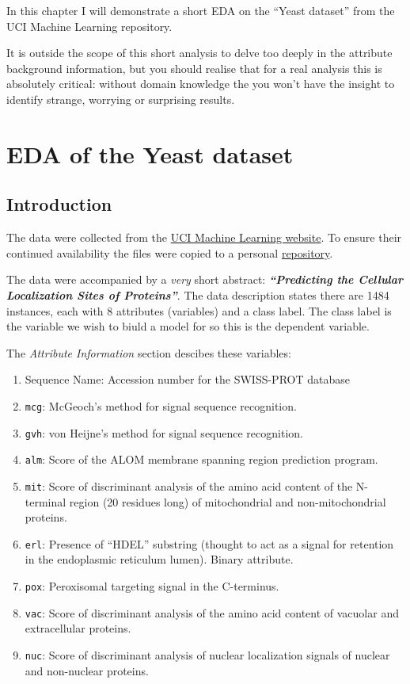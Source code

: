 \documentclass[]{book}
\providecommand{\tightlist}{%
  \setlength{\itemsep}{0pt}\setlength{\parskip}{0pt}}
\begin{document}
In this chapter I will demonstrate a short EDA on the ``Yeast dataset'' from the UCI Machine Learning repository.

It is outside the scope of this short analysis to delve too deeply in the attribute background information, but you should realise that for a real analysis this is absolutely critical: without domain knowledge the you won't have the insight to identify strange, worrying or surprising results.

\hypertarget{eda-of-the-yeast-dataset}{%
\section{EDA of the Yeast dataset}\label{eda-of-the-yeast-dataset}}

\hypertarget{introduction-2}{%
\subsection{Introduction}\label{introduction-2}}

The data were collected from the \href{https://archive.ics.uci.edu/ml/datasets/Yeast}{UCI Machine Learning website}. To ensure their continued availability the files were copied to a personal \href{https://github.com/MichielNoback/datasets/tree/master/UCI_yeast_protein_loc}{repository}.

The data were accompanied by a \emph{very} short abstract: \textbf{\emph{``Predicting the Cellular Localization Sites of Proteins''}}. The data description states there are 1484 instances, each with 8 attributes (variables) and a class label. The class label is the variable we wish to biuld a model for so this is the dependent variable.

The \emph{Attribute Information} section descibes these variables:

\begin{enumerate}
\def\labelenumi{\arabic{enumi}.}
\tightlist
\item
  Sequence Name: Accession number for the SWISS-PROT database
\item
  \texttt{mcg}: McGeoch's method for signal sequence recognition.
\item
  \texttt{gvh}: von Heijne's method for signal sequence recognition.
\item
  \texttt{alm}: Score of the ALOM membrane spanning region prediction program.
\item
  \texttt{mit}: Score of discriminant analysis of the amino acid content of the N-terminal region (20 residues long) of mitochondrial and non-mitochondrial proteins.
\item
  \texttt{erl}: Presence of ``HDEL'' substring (thought to act as a signal for retention in the endoplasmic reticulum lumen). Binary attribute.
\item
  \texttt{pox}: Peroxisomal targeting signal in the C-terminus.
\item
  \texttt{vac}: Score of discriminant analysis of the amino acid content of vacuolar and extracellular proteins.
\item
  \texttt{nuc}: Score of discriminant analysis of nuclear localization signals of nuclear and non-nuclear proteins.
\end{enumerate}
\end{document}
